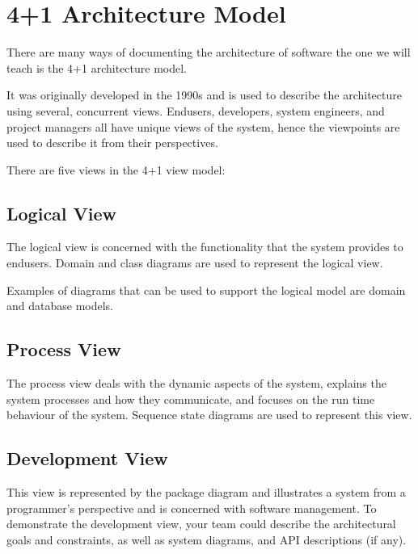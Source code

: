 \documentclass[letterpaper,10pt,english]{jupyterBook}
\begin{document}
\section{4+1 Architecture Model}
\label{\detokenize{chapter_10/architecture:architecture-model}}
\sphinxAtStartPar
There are many ways of documenting the architecture of software \sphinxhyphen{} the
one we will teach is the 4+1 architecture model.

\sphinxAtStartPar
It was originally developed in the 1990s and is used to describe the
architecture using several, concurrent views. End\sphinxhyphen{}users, developers,
system engineers, and project managers all have unique views of the
system, hence the viewpoints are used to describe it from their
perspectives.

\sphinxAtStartPar
There are five views in the 4+1 view model:

\sphinxAtStartPar
{}

\sphinxAtStartPar
{}


\subsection{Logical View}
\label{\detokenize{chapter_10/architecture:logical-view}}
\sphinxAtStartPar
The logical view is concerned with the functionality that the system
provides to end\sphinxhyphen{}users. Domain and class diagrams are used to represent
the logical view.

\sphinxAtStartPar
Examples of diagrams that can be used to support the logical model are
domain and database models.

\sphinxAtStartPar
{}

\sphinxAtStartPar
{}


\subsection{Process View}
\label{\detokenize{chapter_10/architecture:process-view}}
\sphinxAtStartPar
The process view deals with the dynamic aspects of the system, explains
the system processes and how they communicate, and focuses on the run
time behaviour of the system. Sequence state diagrams are used to
represent this view.


\subsection{Development View}
\label{\detokenize{chapter_10/architecture:development-view}}
\sphinxAtStartPar
This view is represented by the package diagram and illustrates a system
from a programmer’s perspective and is concerned with software
management. To demonstrate the development view, your team could
describe the architectural goals and constraints, as well as system
diagrams, and API descriptions (if any).
\end{document}
